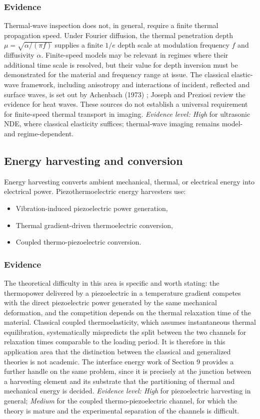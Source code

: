 \subsubsection{Evidence}
Thermal-wave inspection does not, in general, require a finite thermal propagation speed. Under Fourier diffusion, the thermal penetration depth $\mu=\sqrt{\alpha/(\pi f)}$ supplies a finite $1/e$ depth scale at modulation frequency $f$ and diffusivity $\alpha$. Finite-speed models may be relevant in regimes where their additional time scale is resolved, but their value for depth inversion must be demonstrated for the material and frequency range at issue. The classical elastic-wave framework, including anisotropy and interactions of incident, reflected and surface waves, is set out by Achenbach (1973) \cite{Achenbach1973}; Joseph and Preziosi \cite{Joseph1989,Joseph1990} review the evidence for heat waves. These sources do not establish a universal requirement for finite-speed thermal transport in imaging. \emph{Evidence level: High} for ultrasonic NDE, where classical elasticity suffices; thermal-wave imaging remains model- and regime-dependent.

\subsection{Energy harvesting and conversion}
\label{sec:13.3}

Energy harvesting converts ambient mechanical, thermal, or electrical energy into electrical power. Piezothermoelectric energy harvesters use:
\begin{itemize}
\item Vibration-induced piezoelectric power generation,
\item Thermal gradient-driven thermoelectric conversion,
\item Coupled thermo-piezoelectric conversion.
\end{itemize}

\subsubsection{Evidence}
The theoretical difficulty in this area is specific and worth stating: the thermopower delivered by a piezoelectric in a temperature gradient competes with the direct piezoelectric power generated by the same mechanical deformation, and the competition depends on the thermal relaxation time of the material. Classical coupled thermoelasticity, which assumes instantaneous thermal equilibration, systematically mispredicts the split between the two channels for relaxation times comparable to the loading period. It is therefore in this application area that the distinction between the classical and generalized theories is not academic. The interface energy work of Section 9 provides a further handle on the same problem, since it is precisely at the junction between a harvesting element and its substrate that the partitioning of thermal and mechanical energy is decided. \emph{Evidence level: High} for piezoelectric harvesting in general; \emph{Medium} for the coupled thermo-piezoelectric channel, for which the theory is mature and the experimental separation of the channels is difficult.

